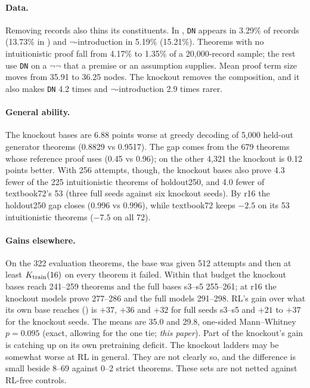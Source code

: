 \paragraph{Data.} Removing \sigp{} records also thins its constituents. In \KTko{}, \texttt{DN} appears in 3.29\% of
records (13.73\% in \KT{}) and $\neg$-introduction in 5.19\% (15.21\%). Theorems with no intuitionistic proof fall from
4.17\% to 1.35\% of a 20,000-record sample; the rest use \texttt{DN} on a $\neg\neg$ that a premise or an assumption
supplies. Mean proof term size moves from 35.91 to 36.25 nodes. The knockout removes the composition, and it also makes
\texttt{DN} 4.2 times and $\neg$-introduction 2.9 times rarer.

\paragraph{General ability.} The knockout bases are 6.88 points worse at greedy decoding of 5,000 held-out generator
theorems (0.8829 vs 0.9517). The gap comes from the 679 theorems whose reference proof uses \sig{} (0.45 vs 0.96); on
the other 4,321 the knockout is 0.12 points better. With 256 attempts, though, the knockout bases also prove 4.3 fewer
of the 225 intuitionistic theorems of holdout250, and 4.0 fewer of textbook72's 53 (three full seeds against six
knockout seeds). By r16 the holdout250 gap closes (0.996 vs 0.996), while textbook72 keeps $-2.5$ on its 53 intuitionistic theorems ($-7.5$ on all 72).

\paragraph{Gains elsewhere.} On the 322 evaluation theorems, the base was given 512 attempts and then at least
$K_{\mathrm{train}}(16)$ on every theorem it failed. Within that budget the knockout bases reach 241--259 theorems and the full bases s3--s5
255--261; at r16 the knockout models prove 277--286 and the full models 291--298. RL's gain over what its own base reaches
(\dcov{}) is $+37$, $+36$ and $+32$ for full seeds s3--s5 and $+21$ to $+37$ for the knockout seeds. The means are 35.0
and 29.8, one-sided Mann--Whitney $p = 0.095$ (exact, allowing for the one tie; \emph{this paper}). Part of the knockout's gain is
catching up on its own pretraining deficit. The knockout ladders may be somewhat worse at RL in general. They are not
clearly so, and the difference is small beside 8--69 against 0--2 strict theorems. These sets are not netted against
RL-free controls.

